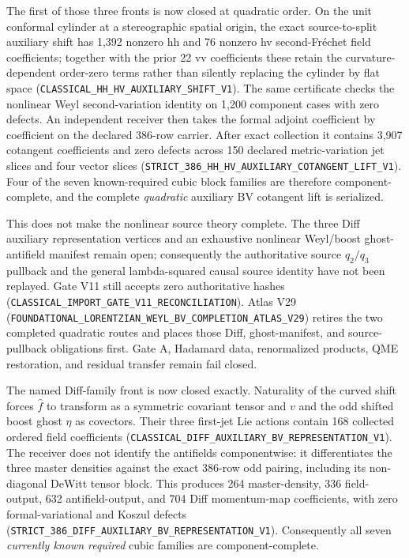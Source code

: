 \documentclass[11pt]{article}
\theoremstyle{definition}
\theoremstyle{remark}
\newcommand{\cert}[1]{\nolinkurl{#1}}
\begin{document}
The first of those three fronts is now closed at quadratic order.  On the
unit conformal cylinder at a stereographic spatial origin, the exact
source-to-split auxiliary shift has 1,392 nonzero hh and 76 nonzero hv
second-Fr\'echet field coefficients; together with the prior 22 vv
coefficients these retain the curvature-dependent order-zero terms rather
than silently replacing the cylinder by flat space
(\cert{CLASSICAL_HH_HV_AUXILIARY_SHIFT_V1}).  The same certificate checks the
nonlinear Weyl second-variation identity on 1,200 component cases with zero
defects.  An independent receiver then takes the formal adjoint coefficient
by coefficient on the declared 386-row carrier.  After exact collection it
contains 3,907 cotangent coefficients and zero defects across 150 declared
metric-variation jet slices and four vector slices
(\cert{STRICT_386_HH_HV_AUXILIARY_COTANGENT_LIFT_V1}).  Four of the seven
known-required cubic block families are therefore component-complete, and
the complete \emph{quadratic} auxiliary BV cotangent lift is serialized.

This does not make the nonlinear source theory complete.  The three Diff
auxiliary representation vertices and an exhaustive nonlinear Weyl/boost
ghost-antifield manifest remain open; consequently the authoritative source
\(q_2/q_3\) pullback and the general lambda-squared causal source identity
have not been replayed.  Gate V11 still accepts zero authoritative hashes
(\cert{CLASSICAL_IMPORT_GATE_V11_RECONCILIATION}).  Atlas V29
(\cert{FOUNDATIONAL_LORENTZIAN_WEYL_BV_COMPLETION_ATLAS_V29}) retires the two
completed quadratic routes and places those Diff, ghost-manifest, and source-
pullback obligations first.  Gate A, Hadamard data, renormalized products,
QME restoration, and residual transfer remain fail closed.

The named Diff-family front is now closed exactly.  Naturality of the curved
shift forces \(\widehat f\) to transform as a symmetric covariant tensor and
\(v\) and the odd shifted boost ghost \(\eta\) as covectors.  Their three
first-jet Lie actions contain 168 collected ordered field coefficients
(\cert{CLASSICAL_DIFF_AUXILIARY_BV_REPRESENTATION_V1}).  The receiver does not
identify the antifields componentwise: it differentiates the three master
densities against the exact 386-row odd pairing, including its non-diagonal
DeWitt tensor block.  This produces 264 master-density, 336 field-output, 632
antifield-output, and 704 Diff momentum-map coefficients, with zero
formal-variational and Koszul defects
(\cert{STRICT_386_DIFF_AUXILIARY_BV_REPRESENTATION_V1}).  Consequently all
seven \emph{currently known required} cubic families are component-complete.
\end{document}
